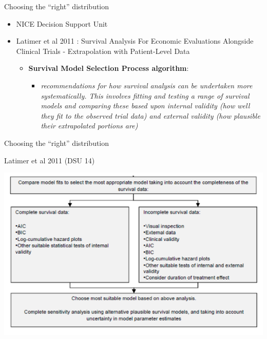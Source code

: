 \documentclass[
  ignorenonframetext,
]{beamer}
\providecommand{\tightlist}{%
  \setlength{\itemsep}{0pt}\setlength{\parskip}{0pt}}
\begin{document}
\begin{frame}{Choosing the ``right'' distribution}
\protect\hypertarget{choosing-the-right-distribution-1}{}

\begin{itemize}
\tightlist
\item
  NICE Decision Support Unit
\item
  Latimer et al 2011 : Survival Analysis For Economic Evaluations
  Alongside Clinical Trials - Extrapolation with Patient-Level Data

  \begin{itemize}
  \tightlist
  \item
    \textbf{Survival Model Selection Process algorithm}:

    \begin{itemize}
    \tightlist
    \item
      \emph{recommendations for how survival analysis can be undertaken
      more systematically. This involves fitting and testing a range of
      survival models and comparing these based upon internal validity
      (how well they fit to the observed trial data) and external
      validity (how plausible their extrapolated portions are)}
    \end{itemize}
  \end{itemize}
\end{itemize}

\end{frame}

\begin{frame}{Choosing the ``right'' distribution}
\protect\hypertarget{choosing-the-right-distribution-2}{}

Latimer et al 2011 (DSU 14)

\includegraphics[width=1\linewidth]{figures/goflatimer}

\end{frame}
\end{document}
